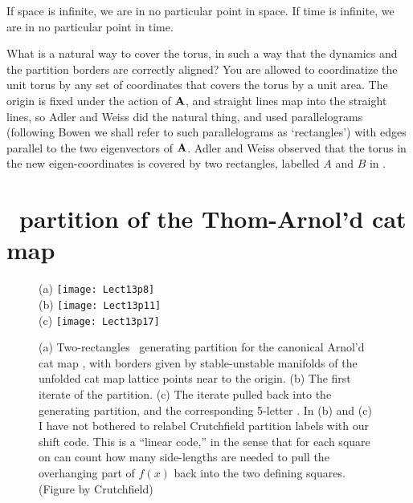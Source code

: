 
\renewcommand{\ssp}{x}
\renewcommand{\Ssym}[1]{{\ensuremath{m_{#1}}}}    %

\begin{bartlett}{
If space is infinite, we are in no particular point
in space. If time is infinite, we are in no particular
point in time.
        }
\end{bartlett}

\bigskip\noindent
What is a natural way to cover the torus, in such a way that the dynamics and
the partition borders are correctly aligned? You are allowed to coordinatize
the unit torus by any set of coordinates that covers the torus by a unit area.
The origin is fixed under the action of ${\bf A}$, and straight lines map into
the straight lines, so Adler and Weiss did the natural thing, and used
parallelograms (following  Bowen we shall refer to such
parallelograms as `rectangles') with edges parallel to the two eigenvectors of
${\bf A}$. Adler and Weiss observed that the torus in the new eigen-coordinates
is covered by two rectangles, labelled $A$ and $B$ in .

\section{\AW\ partition of the Thom-Arnol'd cat map}
\label{sect:AdWei67coord}


\begin{figure}
  \centering
(a) \texttt{[image: Lect13p8]}
\\
(b) \texttt{[image: Lect13p11]}
\\
(c)  \texttt{[image: Lect13p17]}
  \caption{\label{fig:Lect13p8}
(a) Two-rectangles \AW\ generating partition for the canonical Arnol'd cat
map , with borders given by stable-unstable manifolds of the
unfolded cat map lattice points near to the origin.
(b) The first iterate of the partition.
(c) The iterate pulled back into the generating partition,
and the corresponding 5-letter {\markGraph}. In (b) and (c)
I have not bothered to
relabel Crutchfield partition labels with our
shift code. This is a ``linear code,'' in the
sense that for each square on can count how many side-lengths are needed
to pull the overhanging part of $f(x)$ back into the two defining squares.
(Figure by Crutchfield)
}
\end{figure}



